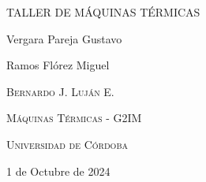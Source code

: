 \documentclass{article}
\author{Gustavo Vergara}
\theoremstyle{mytheoremstyle}
\theoremstyle{mytheoremstyle}
\theoremstyle{myproblemstyle}
\begin{document}
\pgfplotsset{compat=1.18}

\begin{titlepage}
	\centering
	\vspace{2.5cm}
	{\scshape \Large TALLER DE MÁQUINAS TÉRMICAS\par}
	\vspace{5cm}
	\textbf\large\scshape{\par}
	\vspace{0.5cm}
	{\Large Vergara Pareja Gustavo\par}
    {\Large Ramos Flórez Miguel\par}
	\vspace{5cm}
	{\scshape\Large Bernardo J. Luján E. \par}
	\vspace{0.3cm}
	{\scshape\Large Máquinas Térmicas - G2IM \par}
	\vspace{0.3cm}
	{\scshape\Large Universidad de Córdoba\par}
	\vspace{0.3cm}
	{\Large 1 de Octubre de 2024 \par}
\end{titlepage}
\tableofcontents
\newpage
\end{document}
